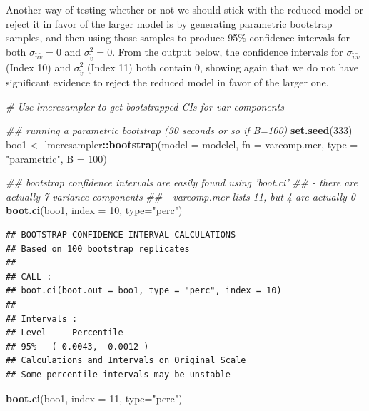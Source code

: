 \documentclass[
]{krantz}
\newenvironment{Shaded}{\begin{snugshade}}{\end{snugshade}}
\newcommand{\CommentTok}[1]{\textcolor[rgb]{0.37,0.37,0.37}{\textit{#1}}}
\newcommand{\DataTypeTok}[1]{\textcolor[rgb]{0.27,0.27,0.27}{#1}}
\newcommand{\DecValTok}[1]{\textcolor[rgb]{0.06,0.06,0.06}{#1}}
\newcommand{\KeywordTok}[1]{\textcolor[rgb]{0.27,0.27,0.27}{\textbf{#1}}}
\newcommand{\NormalTok}[1]{#1}
\newcommand{\OperatorTok}[1]{\textcolor[rgb]{0.43,0.43,0.43}{\textbf{#1}}}
\newcommand{\StringTok}[1]{\textcolor[rgb]{0.5,0.5,0.5}{#1}}
\begin{document}
Another way of testing whether or not we should stick with the reduced model or reject it in favor of the larger model is by generating parametric bootstrap samples, and then using those samples to produce 95\% confidence intervals for both \(\sigma_{\tilde{u}\tilde{v}} = 0\) and \(\sigma_{\tilde{v}}^{2} = 0\). From the output below, the confidence intervals for \(\sigma_{\tilde{u}\tilde{v}}\) (Index 10) and \(\sigma_{\tilde{v}}^{2}\) (Index 11) both contain 0, showing again that we do not have significant evidence to reject the reduced model in favor of the larger one.

\begin{Shaded}
\begin{Highlighting}[]
\CommentTok{# Use lmeresampler to get bootstrapped CIs for var components}

\CommentTok{## running a parametric bootstrap (30 seconds or so if B=100)}
\KeywordTok{set.seed}\NormalTok{(}\DecValTok{333}\NormalTok{)}
\NormalTok{boo1 <-}\StringTok{ }\NormalTok{lmeresampler}\OperatorTok{::}\KeywordTok{bootstrap}\NormalTok{(}\DataTypeTok{model =}\NormalTok{ modelcl, }\DataTypeTok{fn =}\NormalTok{ varcomp.mer, }
                                \DataTypeTok{type =} \StringTok{"parametric"}\NormalTok{, }\DataTypeTok{B =} \DecValTok{100}\NormalTok{)}

\CommentTok{## bootstrap confidence intervals are easily found using 'boot.ci'}
\CommentTok{##  - there are actually 7 variance components}
\CommentTok{##  - varcomp.mer lists 11, but 4 are actually 0}
\KeywordTok{boot.ci}\NormalTok{(boo1, }\DataTypeTok{index =} \DecValTok{10}\NormalTok{, }\DataTypeTok{type=}\StringTok{"perc"}\NormalTok{)}
\end{Highlighting}
\end{Shaded}

\begin{verbatim}
## BOOTSTRAP CONFIDENCE INTERVAL CALCULATIONS
## Based on 100 bootstrap replicates
## 
## CALL : 
## boot.ci(boot.out = boo1, type = "perc", index = 10)
## 
## Intervals : 
## Level     Percentile     
## 95%   (-0.0043,  0.0012 )  
## Calculations and Intervals on Original Scale
## Some percentile intervals may be unstable
\end{verbatim}

\begin{Shaded}
\begin{Highlighting}[]
\KeywordTok{boot.ci}\NormalTok{(boo1, }\DataTypeTok{index =} \DecValTok{11}\NormalTok{, }\DataTypeTok{type=}\StringTok{"perc"}\NormalTok{)}
\end{Highlighting}
\end{Shaded}
\end{document}
